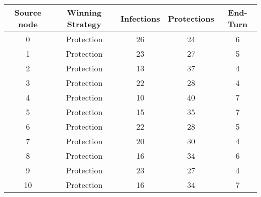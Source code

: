 \documentclass[results.tex]{subfiles}
\begin{document}
    \begin{center}
        \begin{tabular}{| c || c | c | c | c |}
            \hline
            {\bfseries Source node} & {\bfseries Winning Strategy} & {\bfseries Infections} & {\bfseries Protections}
            & {\bfseries End-Turn}
            \\  %
            \hline\hline
            0                       & Protection                   & 26                     & 24                      & 6                    \\
            \hline
            1                       & Protection                   & 23                     & 27                      & 5                    \\
            \hline
            2                       & Protection                   & 13                     & 37                      & 4                    \\
            \hline
            3                       & Protection                   & 22                     & 28                      & 4                    \\
            \hline
            4                       & Protection                   & 10                     & 40                      & 7                    \\
            \hline
            5                       & Protection                   & 15                     & 35                      & 7                    \\
            \hline
            6                       & Protection                   & 22                     & 28                      & 5                    \\
            \hline
            7                       & Protection                   & 20                     & 30                      & 4                    \\
            \hline
            8                       & Protection                   & 16                     & 34                      & 6                    \\
            \hline
            9                       & Protection                   & 23                     & 27                      & 4                    \\
            \hline
            10                      & Protection                   & 16                     & 34                      & 7                    \\

\end{tabular}
\end{center}
\end{document}
